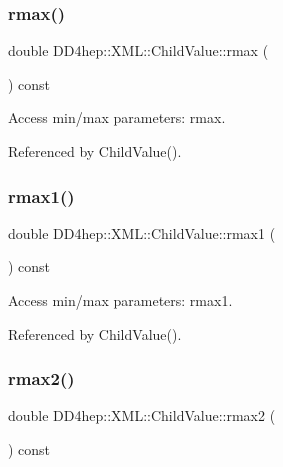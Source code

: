 \subsubsection{\texorpdfstring{rmax()}{rmax()}}
{\footnotesize\ttfamily double D\+D4hep\+::\+X\+M\+L\+::\+Child\+Value\+::rmax (\begin{DoxyParamCaption}{ }\end{DoxyParamCaption}) const}



Access min/max parameters\+: rmax. 



Referenced by Child\+Value().

\hypertarget{struct_d_d4hep_1_1_x_m_l_1_1_child_value_ad848f3ca45a170fc1637e763492ff935}{}\label{struct_d_d4hep_1_1_x_m_l_1_1_child_value_ad848f3ca45a170fc1637e763492ff935} 
\subsubsection{\texorpdfstring{rmax1()}{rmax1()}}
{\footnotesize\ttfamily double D\+D4hep\+::\+X\+M\+L\+::\+Child\+Value\+::rmax1 (\begin{DoxyParamCaption}{ }\end{DoxyParamCaption}) const}



Access min/max parameters\+: rmax1. 



Referenced by Child\+Value().

\hypertarget{struct_d_d4hep_1_1_x_m_l_1_1_child_value_a71cba05de320b00790714ffb32b7cd24}{}\label{struct_d_d4hep_1_1_x_m_l_1_1_child_value_a71cba05de320b00790714ffb32b7cd24} 
\subsubsection{\texorpdfstring{rmax2()}{rmax2()}}
{\footnotesize\ttfamily double D\+D4hep\+::\+X\+M\+L\+::\+Child\+Value\+::rmax2 (\begin{DoxyParamCaption}{ }\end{DoxyParamCaption}) const}



